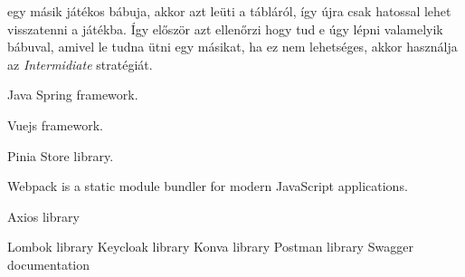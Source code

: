 \documentclass[a4paper,twoside]{article}
\begin{document}
egy másik játékos bábuja, akkor azt leüti a tábláról, így újra csak hatossal lehet visszatenni a játékba. Így először azt ellenőrzi hogy tud e úgy lépni valamelyik bábuval, amivel le tudna ütni egy másikat, ha ez nem lehetséges, akkor használja az \textit{Intermidiate} stratégiát.


\newpage
\begin{thebibliography}{9}
	Java Spring framework.
	
	Vuejs framework.
	
	Pinia Store library.
	
	 Webpack is a static module bundler for modern JavaScript applications.
	 
	 Axios library
	 
	 Lombok library
	 Keycloak library
	 Konva library
	 Postman library
	 Swagger documentation
\end{thebibliography}
\end{document}
